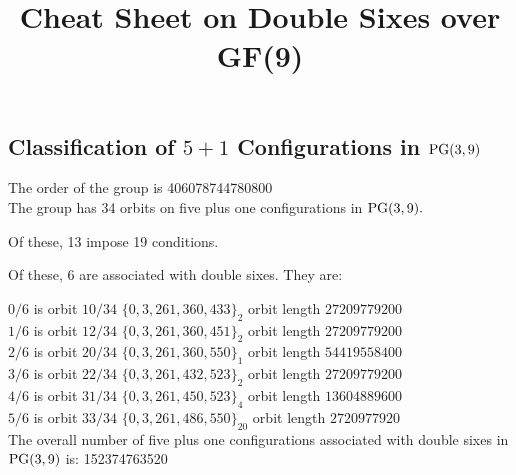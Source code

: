 \documentclass{article}
\newcommand\setTBstruts{\def\T{\rule{0pt}{2.6ex}}%
\def\B{\rule[-1.2ex]{0pt}{0pt}}}
\newcommand{\PG}{{\rm PG}}
\begin{document}
 
\setTBstruts



{\allowdisplaybreaks%






\title{Cheat Sheet on Double Sixes over GF(9) }
\author{}%
\maketitle%
%



\subsection*{Classification of $5+1$ Configurations in $\PG(3,9)$}
The order of the group is 406078744780800\\
\bigskip
The group has 34 orbits on five plus one configurations in $\PG(3,9).$

Of these, 13 impose 19 conditions.

Of these, 6 are associated with double sixes. They are:

$0 / 6$ is orbit $10 / 34$ $
\{ 0, 3, 261, 360, 433 \}_{2}$ orbit length $27209779200$\\
$1 / 6$ is orbit $12 / 34$ $
\{ 0, 3, 261, 360, 451 \}_{2}$ orbit length $27209779200$\\
$2 / 6$ is orbit $20 / 34$ $
\{ 0, 3, 261, 360, 550 \}_{1}$ orbit length $54419558400$\\
$3 / 6$ is orbit $22 / 34$ $
\{ 0, 3, 261, 432, 523 \}_{2}$ orbit length $27209779200$\\
$4 / 6$ is orbit $31 / 34$ $
\{ 0, 3, 261, 450, 523 \}_{4}$ orbit length $13604889600$\\
$5 / 6$ is orbit $33 / 34$ $
\{ 0, 3, 261, 486, 550 \}_{20}$ orbit length $2720977920$\\
The overall number of five plus one configurations associated with double sixes in $\PG(3,9)$ is: 152374763520\\
}
\end{document}
